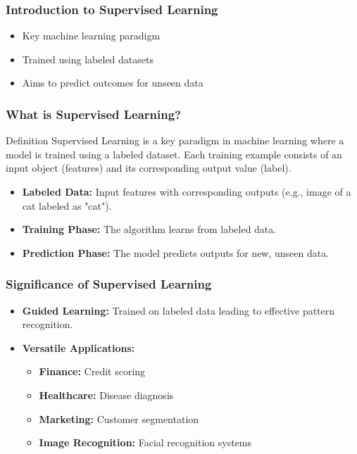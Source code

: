 \documentclass[aspectratio=169]{beamer}
\begin{document}
\frame{\titlepage}

\begin{frame}[fragile]
    \frametitle{Introduction to Supervised Learning}
    \begin{itemize}
        \item Key machine learning paradigm
        \item Trained using labeled datasets
        \item Aims to predict outcomes for unseen data
    \end{itemize}
\end{frame}

\begin{frame}[fragile]
    \frametitle{What is Supervised Learning?}
    \begin{block}{Definition}
        Supervised Learning is a key paradigm in machine learning where a model is trained using a labeled dataset. Each training example consists of an input object (features) and its corresponding output value (label).
    \end{block}
    
    \begin{itemize}
        \item \textbf{Labeled Data:} Input features with corresponding outputs (e.g., image of a cat labeled as "cat").
        \item \textbf{Training Phase:} The algorithm learns from labeled data.
        \item \textbf{Prediction Phase:} The model predicts outputs for new, unseen data.
    \end{itemize}
\end{frame}

\begin{frame}[fragile]
    \frametitle{Significance of Supervised Learning}
    \begin{itemize}
        \item \textbf{Guided Learning:} Trained on labeled data leading to effective pattern recognition.
        \item \textbf{Versatile Applications:}
            \begin{itemize}
                \item \textbf{Finance:} Credit scoring
                \item \textbf{Healthcare:} Disease diagnosis
                \item \textbf{Marketing:} Customer segmentation
                \item \textbf{Image Recognition:} Facial recognition systems
            \end{itemize}
    \end{itemize}
\end{frame}
\end{document}
